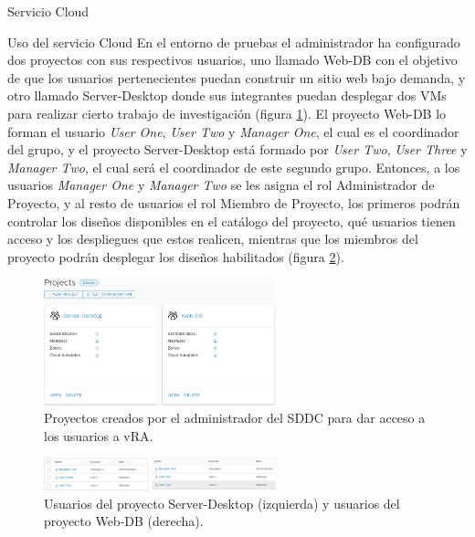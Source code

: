 \begin{subsection}{Servicio Cloud}
\begin{subsubsection}{Uso del servicio Cloud}
        En el entorno de pruebas el administrador ha configurado dos proyectos con sus respectivos usuarios, uno llamado Web-DB con el objetivo de que los usuarios pertenecientes puedan construir un sitio web bajo demanda, y otro llamado Server-Desktop donde sus integrantes puedan desplegar dos VMs para realizar cierto trabajo de investigación (figura \ref{fig:projects-vra}). El proyecto Web-DB lo forman el usuario \textit{User One}, \textit{User Two} y \textit{Manager One}, el cual es el coordinador del grupo, y el proyecto Server-Desktop está formado por \textit{User Two}, \textit{User Three} y \textit{Manager Two}, el cual será el coordinador de este segundo grupo. Entonces, a los usuarios \textit{Manager One} y \textit{Manager Two} se les asigna el rol Administrador de Proyecto, y al resto de usuarios el rol Miembro de Proyecto, los primeros podrán controlar los diseños disponibles en el catálogo del proyecto, qué usuarios tienen acceso y los despliegues que estos realicen, mientras que los miembros del proyecto podrán desplegar los diseños habilitados (figura \ref{fig:project-users}).
        \begin{figure}[h]
            \centering
            \includegraphics[width=0.6\textwidth]{imaxes/pruebaconcepto/vrealize/projects-vRA.png}
            \caption{Proyectos creados por el administrador del SDDC para dar acceso a los usuarios a vRA.}
            \label{fig:projects-vra}
        \end{figure}
        \FloatBarrier
        \begin{figure}[h]
            \centering
            \includegraphics[width=0.6\textwidth]{imaxes/pruebaconcepto/vrealize/users-DB.png}
            \caption{Usuarios del proyecto Server-Desktop (izquierda) y usuarios del proyecto Web-DB (derecha).}
            \label{fig:project-users}
        \end{figure}

\end{subsubsection}
\end{subsection}
